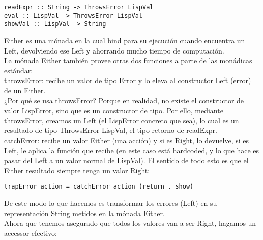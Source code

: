 \begin{minipage}{\linewidth}
\begin{small}
\begin{lstlisting}[frame=single]
readExpr :: String -> ThrowsError LispVal
eval :: LispVal -> ThrowsError LispVal
showVal :: LispVal -> String
\end{lstlisting}
\end{small}
\end{minipage}

Either es una m\'onada en la cual bind para su ejecuci\'on cuando encuentra un Left, devolviendo ese Left y ahorrando mucho tiempo de computaci\'on.\\

La m\'onada Either tambi\'en provee otras dos funciones a parte de las mon\'adicas est\'andar:\\

throwsError: recibe un valor de tipo Error y lo eleva al constructor Left (error) de un Either.\\

¿Por qu\'e se usa throwsError? Porque en realidad, no existe el constructor de valor LispError, sino que es un constructor de tipo. Por ello, mediante throwsError, creamos un Left (el LispError concreto que sea), lo cual es un resultado de tipo ThrowsError LispVal, el tipo retorno de readExpr.\\

catchError: recibe un valor Either (una acci\'on) y si es Right, lo devuelve, si es Left,
le aplica la funci\'on que recibe (en este caso est\'a hardcoded, y lo que hace es pasar del Left a un valor normal de LispVal). El sentido de todo esto es que
el Either resultado siempre tenga un valor Right:\\

\begin{minipage}{\linewidth}
\begin{small}
\begin{lstlisting}[frame=single]
trapError action = catchError action (return . show)
\end{lstlisting}
\end{small}
\end{minipage}

De este modo lo que hacemos es transformar los errores (Left) en su representaci\'on String metidos en la m\'onada Either.\\

Ahora que tenemos asegurado que todos los valores van a ser Right, hagamos un accessor
efectivo:\\

